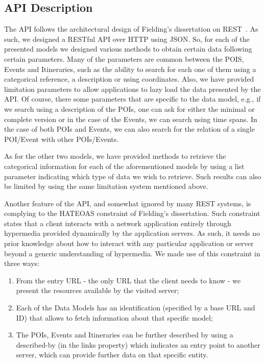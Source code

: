 \documentclass[times]{ettauth}
\begin{document}
\subsection{API Description}
The API follows the architectural design of Fielding's dissertation on \ac{REST}~\cite{fielding}. As such, we designed a RESTful API over HTTP using JSON. So, for each of the presented models we designed various methods to obtain certain data following certain parameters. Many of the parameters are common between the POIS, Events and Itineraries, such as the ability to search for each one of them using a categorical reference, a description or using coordinates. Also, we have provided limitation parameters to allow applications to lazy load the data presented by the API. Of course, there some parameters that are specific to the data model, e.g., if we search using a description of the POIs, one can ask for either the minimal or complete version or in the case of the Events, we can search using time spans. In the case of both POIs and Events, we can also search for the relation of a single POI/Event with other POIs/Events. 

As for the other two models, we have provided methods to retrieve the categorical information for each of the aforementioned models by using a list parameter indicating which type of data we wish to retrieve. Such results can also be limited by using the same limitation system mentioned above.

Another feature of the API, and somewhat ignored by many REST systems, is complying to the \acf{HATEOAS} constraint of Fielding's dissertation. Such constraint states that a client interacts with a network application entirely through hypermedia provided dynamically by the application servers. As such, it needs no prior knowledge about how to interact with any particular application or server beyond a generic understanding of hypermedia. We made use of this constraint in three ways:
\begin{enumerate}
\item From the entry URL - the only URL that the client needs to know - we present the resources available by the visited server;
\item Each of the Data Models has an identification (specified by a base URL and ID) that allows to fetch information about that specific model;
\item The POIs, Events and Itineraries can be further described by using a described-by (in the links property) which indicates an entry point to another server, which can provide further data on that specific entity.
\end{enumerate}
\end{document}
